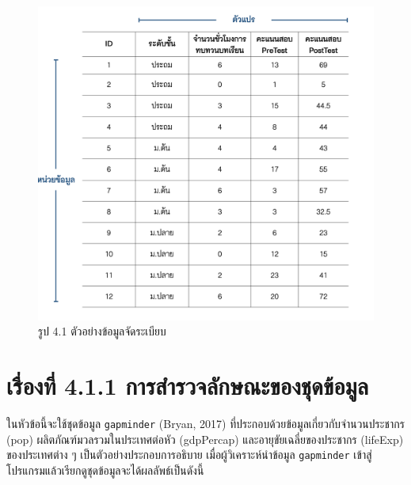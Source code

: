 \documentclass[
  letterpaper,
  DIV=11,
  numbers=noendperiod]{scrreprt}
\begin{document}
\begin{figure}

{\centering \includegraphics[width=1\textwidth,height=\textheight]{./tidydata.png}

}

\caption{รูป 4.1 ตัวอย่างข้อมูลจัดระเบียบ}

\end{figure}

\hypertarget{uxe40uxe23uxe2duxe07uxe17-4.1.1-uxe01uxe32uxe23uxe2auxe33uxe23uxe27uxe08uxe25uxe01uxe29uxe13uxe30uxe02uxe2duxe07uxe0auxe14uxe02uxe2duxe21uxe25}{%
\section*{เรื่องที่ 4.1.1
การสำรวจลักษณะของชุดข้อมูล}\label{uxe40uxe23uxe2duxe07uxe17-4.1.1-uxe01uxe32uxe23uxe2auxe33uxe23uxe27uxe08uxe25uxe01uxe29uxe13uxe30uxe02uxe2duxe07uxe0auxe14uxe02uxe2duxe21uxe25}}

ในหัวข้อนี้จะใช้ชุดข้อมูล \texttt{gapminder} (Bryan, 2017)
ที่ประกอบด้วยข้อมูลเกี่ยวกับจำนวนประชากร (pop) ผลิตภัณฑ์มวลรวมในประเทศต่อหัว
(gdpPercap) และอายุขัยเฉลี่ยของประชากร (lifeExp) ของประเทศต่าง ๆ
เป็นตัวอย่างประกอบการอธิบาย เมื่อผู้วิเคราะห์นำข้อมูล \texttt{gapminder}
เข้าสู่โปรแกรมแล้วเรียกดูชุดข้อมูลจะได้ผลลัพธ์เป็นดังนี้
\end{document}
